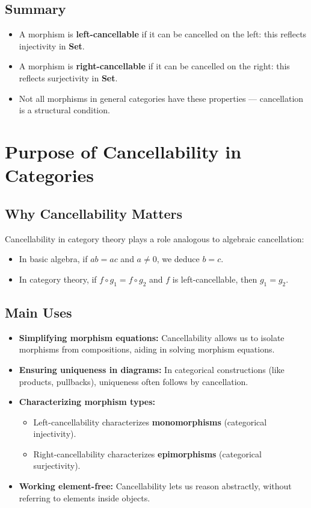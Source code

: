 \documentclass[10pt]{article}
\theoremstyle{plain}
\theoremstyle{definition}
\begin{document}
\subsection*{Summary}

\begin{itemize}
	\item A morphism is \textbf{left-cancellable} if it can be cancelled on the left: this reflects injectivity in \textbf{Set}.
	\item A morphism is \textbf{right-cancellable} if it can be cancelled on the right: this reflects surjectivity in \textbf{Set}.
	\item Not all morphisms in general categories have these properties — cancellation is a structural condition.
\end{itemize}

\section*{Purpose of Cancellability in Categories}

\subsection*{Why Cancellability Matters}

Cancellability in category theory plays a role analogous to algebraic cancellation:
\begin{itemize}
	\item In basic algebra, if \( ab = ac \) and \( a \neq 0 \), we deduce \( b = c \).
	\item In category theory, if \( f \circ g_1 = f \circ g_2 \) and \( f \) is left-cancellable, then \( g_1 = g_2 \).
\end{itemize}

\subsection*{Main Uses}

\begin{itemize}
	\item \textbf{Simplifying morphism equations:}  
	Cancellability allows us to isolate morphisms from compositions, aiding in solving morphism equations.
	
	\item \textbf{Ensuring uniqueness in diagrams:}  
	In categorical constructions (like products, pullbacks), uniqueness often follows by cancellation.
	
	\item \textbf{Characterizing morphism types:}
	\begin{itemize}
		\item Left-cancellability characterizes \textbf{monomorphisms} (categorical injectivity).
		\item Right-cancellability characterizes \textbf{epimorphisms} (categorical surjectivity).
	\end{itemize}
	
	\item \textbf{Working element-free:}  
	Cancellability lets us reason abstractly, without referring to elements inside objects.
\end{itemize}
\end{document}
